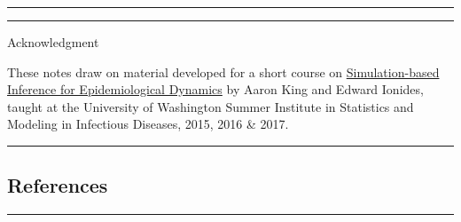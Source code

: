 \documentclass[]{article}
\begin{document}
\begin{center}\rule{0.5\linewidth}{\linethickness}\end{center}

\begin{center}\rule{0.5\linewidth}{\linethickness}\end{center}

Acknowledgment

These notes draw on material developed for a short course on
\href{http://kingaa.github.io/sbied/}{Simulation-based Inference for
Epidemiological Dynamics} by Aaron King and Edward Ionides, taught at
the University of Washington Summer Institute in Statistics and Modeling
in Infectious Diseases, 2015, 2016 \& 2017.

\begin{center}\rule{0.5\linewidth}{\linethickness}\end{center}

\subsection{References}\label{references}

\begin{center}\rule{0.5\linewidth}{\linethickness}\end{center}
\end{document}
